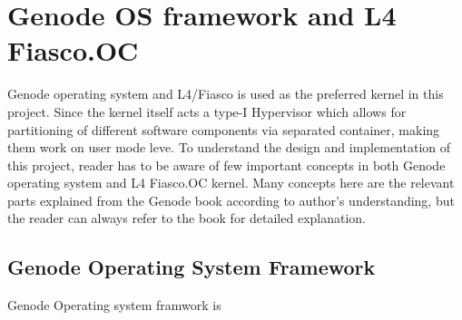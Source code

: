 \chapter{ Genode OS framework and L4 Fiasco.OC}
Genode operating system and L4/Fiasco is used as the preferred kernel in this project.
Since the kernel itself acts a type-I Hypervisor which allows for partitioning of different
software components via separated container, making them work on user mode leve.
To understand the design and implementation of this project, reader has to be aware of few important concepts in both Genode operating system and L4 Fiasco.OC kernel. Many concepts here are the relevant parts explained from the Genode book 
according to author's understanding, but the reader can always refer to the book for detailed explanation.

\section{Genode Operating System Framework}
Genode Operating system framwork is


